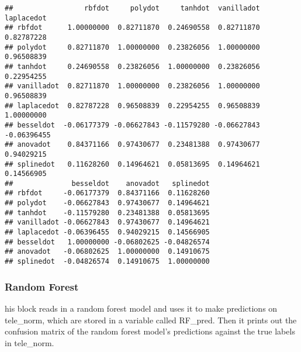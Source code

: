 \documentclass[
]{article}
\newenvironment{Shaded}{\begin{snugshade}}{\end{snugshade}}
\newcommand{\ConstantTok}[1]{\textcolor[rgb]{0.00,0.00,0.00}{#1}}
\newcommand{\DecValTok}[1]{\textcolor[rgb]{0.00,0.00,0.81}{#1}}
\newcommand{\FunctionTok}[1]{\textcolor[rgb]{0.00,0.00,0.00}{#1}}
\newcommand{\NormalTok}[1]{#1}
\newcommand{\OtherTok}[1]{\textcolor[rgb]{0.56,0.35,0.01}{#1}}
\newcommand{\SpecialCharTok}[1]{\textcolor[rgb]{0.00,0.00,0.00}{#1}}
\newcommand{\StringTok}[1]{\textcolor[rgb]{0.31,0.60,0.02}{#1}}
\begin{document}
\begin{verbatim}
##                 rbfdot     polydot     tanhdot  vanilladot  laplacedot
## rbfdot      1.00000000  0.82711870  0.24690558  0.82711870  0.82787228
## polydot     0.82711870  1.00000000  0.23826056  1.00000000  0.96508839
## tanhdot     0.24690558  0.23826056  1.00000000  0.23826056  0.22954255
## vanilladot  0.82711870  1.00000000  0.23826056  1.00000000  0.96508839
## laplacedot  0.82787228  0.96508839  0.22954255  0.96508839  1.00000000
## besseldot  -0.06177379 -0.06627843 -0.11579280 -0.06627843 -0.06396455
## anovadot    0.84371166  0.97430677  0.23481388  0.97430677  0.94029215
## splinedot   0.11628260  0.14964621  0.05813695  0.14964621  0.14566905
##              besseldot    anovadot   splinedot
## rbfdot     -0.06177379  0.84371166  0.11628260
## polydot    -0.06627843  0.97430677  0.14964621
## tanhdot    -0.11579280  0.23481388  0.05813695
## vanilladot -0.06627843  0.97430677  0.14964621
## laplacedot -0.06396455  0.94029215  0.14566905
## besseldot   1.00000000 -0.06802625 -0.04826574
## anovadot   -0.06802625  1.00000000  0.14910675
## splinedot  -0.04826574  0.14910675  1.00000000
\end{verbatim}

\begin{Shaded}
\end{Shaded}

\hypertarget{random-forest}{%
\subsubsection{Random Forest}\label{random-forest}}

his block reads in a random forest model and uses it to make predictions
on tele\_norm, which are stored in a variable called RF\_pred. Then it
prints out the confusion matrix of the random forest model's predictions
against the true labels in tele\_norm.

\begin{Shaded}
\end{Shaded}
\end{document}
